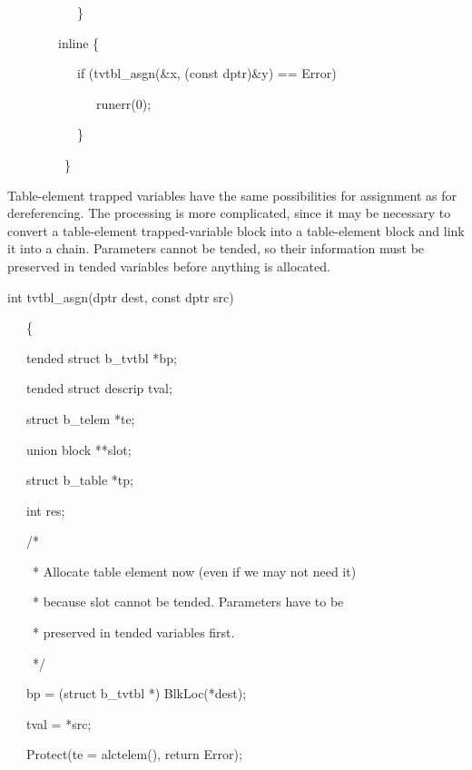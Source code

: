 {\ttfamily\mdseries
\ \ \ \ \ \ \ \ \ \ \ \}}

{\ttfamily\mdseries
\ \ \ \ \ \ \ \ inline \{}

{\ttfamily\mdseries
\ \ \ \ \ \ \ \ \ \ \ if (tvtbl\_asgn(\&x, (const dptr)\&y) == Error)}

{\ttfamily\mdseries
\ \ \ \ \ \ \ \ \ \ \ \ \ \ runerr(0);}

{\ttfamily\mdseries
\ \ \ \ \ \ \ \ \ \ \ \}}

{\ttfamily\mdseries
\ \ \ \ \ \ \ \ \ \}}


Table-element trapped variables have the same possibilities for
assignment as for dereferencing. The processing is more complicated,
since it may be necessary to convert a table-element trapped-variable
block into a table-element block and link it into a chain. Parameters
cannot be tended, so their information must be preserved in tended
variables before anything is allocated.

{\ttfamily\mdseries
int tvtbl\_asgn(dptr dest, const dptr src)}

{\ttfamily\mdseries
\ \ \ \{}

{\ttfamily\mdseries
\ \ \ tended struct b\_tvtbl *bp;}

{\ttfamily\mdseries
\ \ \ tended struct descrip tval;}

{\ttfamily\mdseries
\ \ \ struct b\_telem *te;}

{\ttfamily\mdseries
\ \ \ union block **slot;}

{\ttfamily\mdseries
\ \ \ struct b\_table *tp;}

{\ttfamily\mdseries
\ \ \ int res;}

\bigskip

{\ttfamily\mdseries
\ \ \ /*}

{\ttfamily\mdseries
\ \ \ \ * Allocate table element now (even if we may not need it)}

{\ttfamily\mdseries
\ \ \ \ * because slot cannot be tended. Parameters have to be}

{\ttfamily\mdseries
\ \ \ \ * preserved in tended variables first.}

{\ttfamily\mdseries
\ \ \ \ */}

{\ttfamily\mdseries
\ \ \ bp = (struct b\_tvtbl *) BlkLoc(*dest);}

{\ttfamily\mdseries
\ \ \ tval = *src;}

{\ttfamily\mdseries
\ \ \ Protect(te = alctelem(), return Error);}


\bigskip

